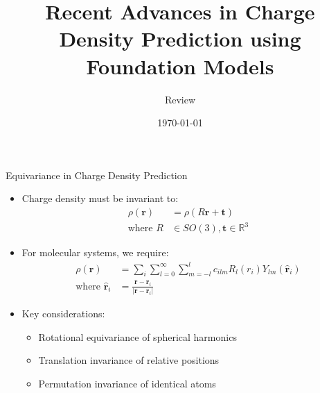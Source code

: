 \documentclass[aspectratio=169]{beamer}
\title{Recent Advances in Charge Density Prediction using Foundation Models}
\author{Review}
\date{\today}
\begin{document}


\begin{frame}{Equivariance in Charge Density Prediction}
    \begin{itemize}
        \item Charge density must be invariant to:
        \begin{align*}
            \rho(\mathbf{r}) &= \rho(R\mathbf{r} + \mathbf{t}) \\
            \text{where } R &\in SO(3), \mathbf{t} \in \mathbb{R}^3
        \end{align*}
        \item For molecular systems, we require:
        \begin{align*}
            \rho(\mathbf{r}) &= \sum_{i} \sum_{l=0}^{\infty} \sum_{m=-l}^{l} c_{ilm} R_{l}(r_i)Y_{lm}(\hat{\mathbf{r}}_i) \\
            \text{where } \hat{\mathbf{r}}_i &= \frac{\mathbf{r} - \mathbf{r}_i}{|\mathbf{r} - \mathbf{r}_i|}
        \end{align*}
        \item Key considerations:
        \begin{itemize}
            \item Rotational equivariance of spherical harmonics
            \item Translation invariance of relative positions
            \item Permutation invariance of identical atoms
        \end{itemize}
    \end{itemize}
\end{frame}
\end{document}
